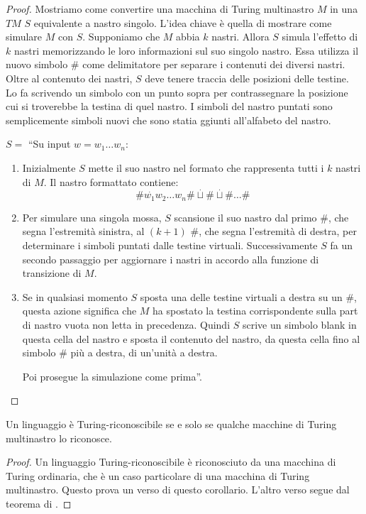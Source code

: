 \documentclass[12pt]{report}
\newcounter{corollary}
\newcommand{\namerefl}[1]{%
	\bgroup
	\let\nmu\MakeLowercase
	\nameref{#1}\egroup}
\newcommand{\nmu}{}
\begin{document}
\begin{proof}
	Mostriamo come convertire una macchina di Turing multinastro $M$ in una $TM$ $S$ equivalente a nastro singolo. L'idea chiave è quella di mostrare come simulare $M$ con $S$. Supponiamo  che $M$ abbia $k$ nastri. Allora $S$ simula l'effetto di $k$ nastri memorizzando le loro informazioni sul suo singolo nastro. Essa utilizza il nuovo simbolo $\#$ come delimitatore per separare i contenuti dei diversi nastri. Oltre al contenuto dei nastri, $S$ deve tenere traccia delle posizioni delle testine. Lo fa scrivendo un simbolo con un punto sopra per contrassegnare la posizione cui si troverebbe la testina di quel nastro. I simboli del nastro puntati sono semplicemente simboli nuovi che sono statia ggiunti all'alfabeto del nastro.

	$S = $ ``Su input $w = w_1\dots w_n$:
	\begin{enumerate}
		\item Inizialmente $S$ mette il suo nastro nel formato che rappresenta tutti i $k$ nastri di $M$. Il nastro formattato contiene:
		\[
		\#\overset{\cdot}{w_1}w_2 \dots w_n\#\overset{\cdot}{\sqcup}\#\overset{\cdot}{\sqcup}\# \dots \#
		\]
		\item Per simulare una singola mossa, $S$ scansione il suo nastro dal primo $\#$, che segna l'estremità sinistra, al $(k+1)$ \#, che segna l'estremità di destra, per determinare i simboli puntati dalle testine virtuali. Successivamente $S$ fa un secondo passaggio per aggiornare i nastri in accordo alla funzione di transizione di $M$.
		\item Se in qualsiasi momento $S$ sposta una delle testine virtuali a destra su un \#, questa azione significa che $M$ ha spostato la testina corrispondente sulla part di nastro vuota non letta in precedenza. Quindi $S$ scrive un simbolo blank in questa cella del nastro e sposta il contenuto del nastro, da questa cella fino al simbolo \# più a destra, di un'unità a destra.

		Poi prosegue la simulazione come prima''.
	\end{enumerate}
\end{proof}
\begin{corollary}{}{}
	Un linguaggio è Turing-riconoscibile se e solo se qualche macchine di Turing multinastro lo riconosce.
\end{corollary}
\begin{proof}
Un linguaggio Turing-riconoscibile è riconosciuto da una macchina di Turing ordinaria, che è un caso particolare di una macchina di Turing multinastro. Questo prova un verso di questo corollario. L'altro verso segue dal teorema di \namerefl{th:equiv_multinastro}.
\end{proof}
\end{document}
